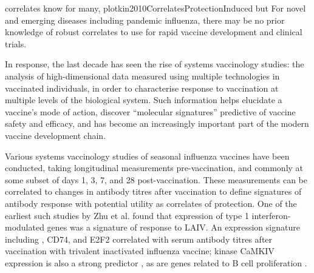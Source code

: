correlates know for many, plotkin2010CorrelatesProtectionInduced
but
For novel and emerging diseases including pandemic influenza, there may be no prior knowledge of robust correlates to use for rapid vaccine development and clinical trials.

In response, the last decade has seen the rise of systems vaccinology studies: the analysis of high-dimensional data measured using multiple technologies in vaccinated individuals, in order to characterise response to vaccination at multiple levels of the biological system\autocite{pulendran2014SystemsVaccinologyProbing}.
Such information helps elucidate a vaccine's mode of action, discover \enquote{molecular signatures} predictive of vaccine safety and efficacy, and has become an increasingly important part of the modern vaccine development chain\autocite{hagan2015SystemsVaccinologyEnabling,raeven2019SystemsVaccinologyBig}.

Various systems vaccinology studies of seasonal influenza vaccines have been conducted, taking longitudinal measurements pre-vaccination, and commonly at some subset of days 1, 3, 7, and 28 post-vaccination.
These measurements can be correlated to changes in antibody titres after vaccination to define signatures of antibody response with potential utility as correlates of protection.
One of the earliest such studies by Zhu et al.\autocite{zhu2010WholeGenomeTranscriptional} found that expression of type 1 interferon-modulated genes was a signature of response to \gls{LAIV}.
An expression signature including , CD74, and E2F2 correlated with serum antibody titres after vaccination with trivalent inactivated influenza vaccine\autocite{bucasas2011EarlyPatternsGene}; kinase CaMKIV expression is also a strong predictor \autocite{nakaya2011SystemsBiologyVaccination}, as are genes related to B cell proliferation \autocite{tan2014GeneSignaturesRelated}.


%

